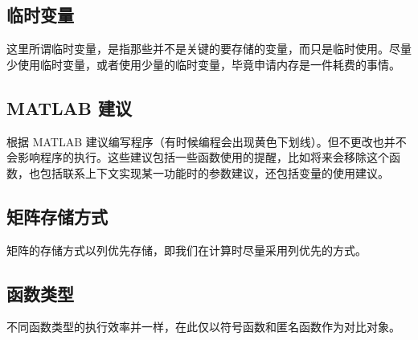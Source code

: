 \subsection{临时变量}

这里所谓临时变量，是指那些并不是关键的要存储的变量，而只是临时使用。尽量少使用临时变量，或者使用少量的临时变量，毕竟申请内存是一件耗费的事情。





\subsection{MATLAB 建议}

根据 MATLAB 建议编写程序（有时候编程会出现黄色下划线）。但不更改也并不会影响程序的执行。这些建议包括一些函数使用的提醒，比如将来会移除这个函数，也包括联系上下文实现某一功能时的参数建议，还包括变量的使用建议。





\subsection{矩阵存储方式}

矩阵的存储方式以列优先存储，即我们在计算时尽量采用列优先的方式。

\vspace{-0.8cm}


\vspace{-0.8cm}






\subsection{函数类型}

不同函数类型的执行效率并一样，在此仅以符号函数和匿名函数作为对比对象。

\vspace{-0.8cm}


\vspace{-0.8cm}






